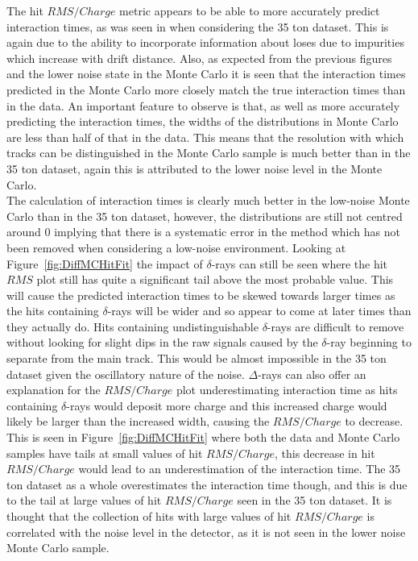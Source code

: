 The hit $RMS/Charge$ metric appears to be able to more accurately predict interaction times, as was seen in when considering the 35 ton dataset. This is again due to the ability to incorporate information about loses due to impurities which increase with drift distance. Also, as expected from the previous figures and the lower noise state in the Monte Carlo it is seen that the interaction times predicted in the Monte Carlo more closely match the true interaction times than in the data. An important feature to observe is that, as well as more accurately predicting the interaction times, the widths of the distributions in Monte Carlo are less than half of that in the data. This means that the resolution with which tracks can be distinguished in the Monte Carlo sample is much better than in the 35 ton dataset, again this is attributed to the lower noise level in the Monte Carlo. \\

The calculation of interaction times is clearly much better in the low-noise Monte Carlo than in the 35 ton dataset, however, the distributions are still not centred around 0 implying that there is a systematic error in the method which has not been removed when considering a low-noise environment. Looking at Figure~\ref{fig:DiffMCHitFit} the impact of $\delta$-rays can still be seen where the hit $RMS$ plot still has quite a significant tail above the most probable value. This will cause the predicted interaction times to be skewed towards larger times as the hits containing $\delta$-rays will be wider and so appear to come at later times than they actually do. Hits containing undistinguishable $\delta$-rays are difficult to remove without looking for slight dips in the raw signals caused by the $\delta$-ray beginning to separate from the main track. This would be almost impossible in the 35 ton dataset given the oscillatory nature of the noise. $\Delta$-rays can also offer an explanation for the $RMS/Charge$ plot underestimating interaction time as hits containing $\delta$-rays would deposit more charge and this increased charge would likely be larger than the increased width, causing the $RMS/Charge$ to decrease. This is seen in Figure~\ref{fig:DiffMCHitFit} where both the data and Monte Carlo samples have tails at small values of hit $RMS/Charge$, this decrease in hit $RMS/Charge$ would lead to an underestimation of the interaction time. The 35 ton dataset as a whole overestimates the interaction time though, and this is due to the tail at large values of hit $RMS/Charge$ seen in the 35 ton dataset. It is thought that the collection of hits with large values of hit $RMS/Charge$ is correlated with the noise level in the detector, as it is not seen in the lower noise Monte Carlo sample. \\

